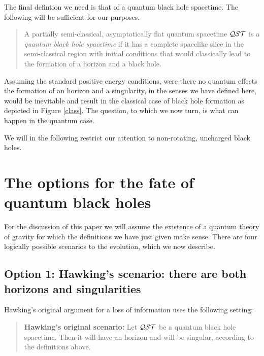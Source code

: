 \documentclass[12pt]{article}
\begin{document}
The final defintion we need is that of  a quantum black hole spacetime.  The following will be 
sufficient for our purposes.

\begin{quotation}

A partially semi-classical, asymptotically flat quantum spacetime ${\cal Q}{\cal S}{\cal T}$ is a {\it quantum black hole  spacetime} if it has a complete spacelike slice in the semi-classical region with initial conditions that would 
classically lead to the formation of a horizon and a black hole.  

\end{quotation}


Assuming the standard positive energy conditions, were there no quantum effects the formation of  an horizon and a singularity, in the senses we have defined here, would be inevitable and result in the classical case of black hole formation as depicted in Figure \ref{class}. The question, to which we now turn, is what can happen in the quantum case.  

We will in the following restrict our attention to non-rotating, uncharged black holes.



\section{The options for the fate of quantum black holes}
\label{options}

For the discussion of this paper we will assume the existence of a quantum theory of gravity for which the definitions we have just given make sense. There are four logically possible scenarios to the evolution, which we now describe.

\subsection*{Option 1: Hawking's scenario: there are both horizons and singularities}



Hawking's original argument \cite{Hawk74,Hawking} for a loss of information uses the following setting:

\begin{quotation}

{\bf Hawking's original scenario: } Let  ${\cal Q}{\cal S}{\cal T}$ be a quantum  black hole spacetime.  Then it will have an horizon and will be singular, according to the definitions above.  

\end{quotation}
\end{document}
